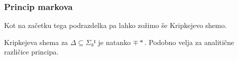 \subsubsection{Princip markova}

Kot na začetku tega podrazdelka pa lahko zožimo še Kripkejevo shemo.
\begin{trditev}
  Kripkejeva shema za \(Δ ⊆ Σ₀¹\) je natanko \(\mp*\). Podobno velja za
  analitične različice principa.
\end{trditev}

